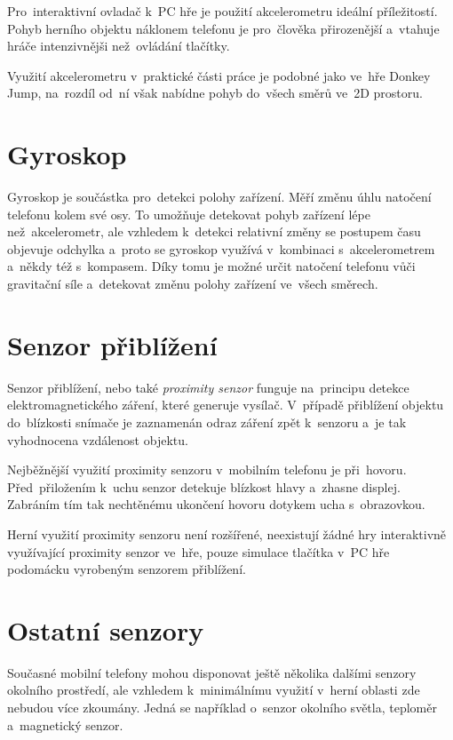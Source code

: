 \documentclass[thesis=B,czech,hidelinks]{FITthesis}[2012/06/26] %
\begin{document}
Pro~interaktivní ovladač k~PC hře je použití akcelerometru ideální příležitostí. Pohyb herního objektu náklonem telefonu je pro~člověka přirozenější a~vtahuje hráče intenzivnějši než~ovládání tlačítky. 

Využití akcelerometru v~praktické části práce je podobné jako ve~hře Donkey Jump, na~rozdíl od~ní však nabídne pohyb do~všech směrů ve~2D prostoru.

\section{Gyroskop}

Gyroskop je součástka pro~detekci polohy zařízení. Měří změnu úhlu natočení telefonu kolem své osy. To umožňuje detekovat pohyb zařízení lépe než~akcelerometr, ale vzhledem k~detekci relativní změny se postupem času objevuje odchylka a~proto se gyroskop využívá v~kombinaci s~akcelerometrem a~někdy též s~kompasem. Díky tomu je možné určit natočení telefonu vůči gravitační síle a~detekovat změnu polohy zařízení ve~všech směrech. \cite{gyroscope}

\section{Senzor přiblížení}

Senzor přiblížení, nebo také \textit{proximity senzor} funguje na~principu detekce elektromagnetického záření, které generuje vysílač. V~případě přiblížení objektu do~blízkosti snímače je zaznamenán odraz záření zpět k~senzoru a~je tak vyhodnocena vzdálenost objektu. \cite{proximity}

Nejběžnější využití proximity senzoru v~mobilním telefonu je při~hovoru. Před~přiložením k~uchu senzor detekuje blízkost hlavy a~zhasne displej. Zabráním tím tak nechtěnému ukončení hovoru dotykem ucha s~obrazovkou.

Herní využití proximity senzoru není rozšířené, neexistují žádné hry interaktivně využívající proximity senzor ve~hře, pouze simulace tlačítka v~PC hře podomácku vyrobeným senzorem přiblížení. \cite{proximitygame}

\section{Ostatní senzory}

Současné mobilní telefony mohou disponovat ještě několika dalšími senzory okolního prostředí, ale vzhledem k~minimálnímu využití v~herní oblasti zde nebudou více zkoumány. Jedná se například o~senzor okolního světla, teploměr a~magnetický senzor. 
\end{document}
